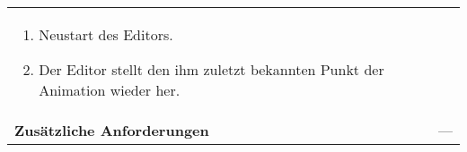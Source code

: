 \begin{longtabu}{p{0.5\textwidth}p{0.5\textwidth}}
\begin{enumerate}[label= (\alph*)]
{\begin{enumerate}[label= (\roman*)]
{                                ab.}
                        \item{Neustart des Editors.}
                        \item{Der Editor stellt den ihm zuletzt bekannten
                                Punkt der Animation wieder her.}
                \end{enumerate}
            } \end{enumerate}
        \\
    \cmidrule(r){1-1}\cmidrule(lr){2-2}
        \textbf{Zusätzliche Anforderungen} &
        --- \\
    \bottomrule
\end{longtabu}
